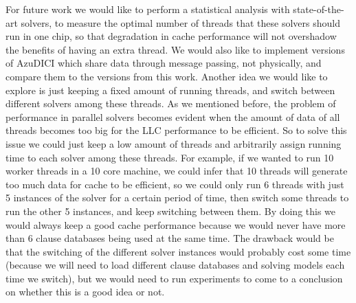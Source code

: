 \documentclass[12pt]{diicc}
\begin{document}
For future work we would like to perform a statistical analysis with state-of-the-art solvers, to measure the optimal number of threads that these solvers should run in one chip, so that degradation in cache performance will not overshadow the benefits of having an extra thread. We would also like to implement versions of AzuDICI which share data through message passing, not physically, and compare them to the versions from this work. Another idea we would like to explore is just keeping a fixed amount of running threads, and switch between different solvers among these threads. As we mentioned before, the problem of performance in parallel solvers becomes evident when the amount of data of all threads becomes too big for the LLC performance to be efficient. So to solve this issue we could just keep a low amount of threads and arbitrarily assign running time to each solver among these threads. For example, if we wanted to run 10 worker threads in a 10 core machine, we could infer that 10 threads will generate too much data for cache to be efficient, so we could only run 6 threads with just 5 instances of the solver for a certain period of time, then switch some threads to run the other 5 instances, and keep switching between them. By doing this we would always keep a good cache performance because we would never have more than 6 clause databases being used at the same time. The drawback would be that the switching of the different solver instances would probably cost some time (because we will need to load different clause databases and solving models each time we switch), but we would need to run experiments to come to a conclusion on whether this is a good idea or not. 

%
% 
%


\end{document}
